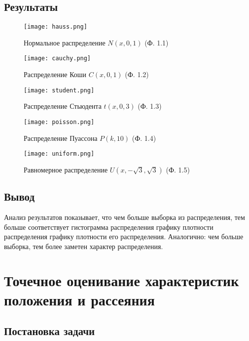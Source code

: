 \documentclass[14pt]{extarticle}
\begin{document}
\subsection{Результаты}

\begin{figure}[H]
    \centering
    \texttt{[image: hauss.png]}
    \caption{Нормальное распределение \(N(x, 0, 1)\) (Ф. 1.1)}
    \label{fig:enter-label}
\end{figure}

\begin{figure}[H]
    \centering
    \texttt{[image: cauchy.png]}
    \caption{Распределение Коши \(C(x, 0, 1)\) (Ф. 1.2)}
    \label{fig:enter-label}
\end{figure}

\begin{figure}[H]
    \centering
    \texttt{[image: student.png]}
    \caption{Распределение Стьюдента \(t(x, 0, 3)\) (Ф. 1.3)}
    \label{fig:enter-label}
\end{figure}

\begin{figure}[H]
    \centering
    \texttt{[image: poisson.png]}
    \caption{Распределение Пуассона \(P(k, 10)\) (Ф. 1.4)}
    \label{fig:enter-label}
\end{figure}

\begin{figure}[H]
    \centering
    \texttt{[image: uniform.png]}
    \caption{Равномерное распределение \(U (x, -\sqrt{3}, \sqrt{3})\) (Ф. 1.5)}
    \label{fig:enter-label}
\end{figure}

\subsection{Вывод}

Анализ результатов показывает, что чем больше выборка из распределения, тем больше соответствует гистограмма распределения графику плотности распределения графику плотности его распределения. Аналогично: чем больше выборка, тем более заметен характер распределения.

\section{Точечное оценивание характеристик положения и рассеяния}

\subsection{Постановка задачи}
\end{document}
